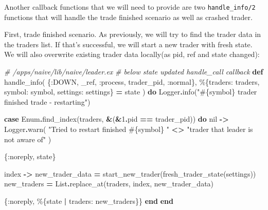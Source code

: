 \documentclass[
]{book}
\newenvironment{Shaded}{\begin{snugshade}}{\end{snugshade}}
\newcommand{\CommentTok}[1]{\textcolor[rgb]{0.56,0.35,0.01}{\textit{#1}}}
\newcommand{\ConstantTok}[1]{\textcolor[rgb]{0.00,0.00,0.00}{#1}}
\newcommand{\DecValTok}[1]{\textcolor[rgb]{0.00,0.00,0.81}{#1}}
\newcommand{\KeywordTok}[1]{\textcolor[rgb]{0.13,0.29,0.53}{\textbf{#1}}}
\newcommand{\NormalTok}[1]{#1}
\newcommand{\OperatorTok}[1]{\textcolor[rgb]{0.81,0.36,0.00}{\textbf{#1}}}
\newcommand{\OtherTok}[1]{\textcolor[rgb]{0.56,0.35,0.01}{#1}}
\newcommand{\StringTok}[1]{\textcolor[rgb]{0.31,0.60,0.02}{#1}}
\newcommand{\VariableTok}[1]{\textcolor[rgb]{0.00,0.00,0.00}{#1}}
\begin{document}
Another callback functions that we will need to provide are two \texttt{handle\_info/2} functions that will handle the trade finished scenario as well as crashed trader.

First, trade finished scenario. As previously, we will try to find the trader data in the traders list. If that's successful, we will start a new trader with fresh state. We will also overwrite existing trader data locally(as pid, ref and state changed):

\begin{Shaded}
\begin{Highlighting}[]
  \CommentTok{\# /apps/naive/lib/naive/leader.ex}
  \CommentTok{\# below state updated handle\_call callback}
  \KeywordTok{def}\NormalTok{ handle\_info(}
\NormalTok{        \{}\VariableTok{:DOWN}\NormalTok{, \_ref, }\VariableTok{:process}\NormalTok{, trader\_pid, }\VariableTok{:normal}\NormalTok{\},}
\NormalTok{        \%\{}\VariableTok{traders:}\NormalTok{ traders, }\VariableTok{symbol:}\NormalTok{ symbol, }\VariableTok{settings:}\NormalTok{ settings\} }\OperatorTok{=}\NormalTok{ state}
\NormalTok{      ) }\KeywordTok{do}
    \ConstantTok{Logger}\OperatorTok{.}\NormalTok{info(}\StringTok{"}\OtherTok{\#\{}\NormalTok{symbol}\OtherTok{\}}\StringTok{ trader finished trade {-} restarting"}\NormalTok{)}

    \KeywordTok{case} \ConstantTok{Enum}\OperatorTok{.}\NormalTok{find\_index(traders, }\OperatorTok{\&}\NormalTok{(}\OperatorTok{\&}\DecValTok{1}\OperatorTok{.}\NormalTok{pid }\OperatorTok{==}\NormalTok{ trader\_pid)) }\KeywordTok{do}
      \ConstantTok{nil} \OperatorTok{{-}\textgreater{}}
        \ConstantTok{Logger}\OperatorTok{.}\NormalTok{warn(}
          \StringTok{"Tried to restart finished }\OtherTok{\#\{}\NormalTok{symbol}\OtherTok{\}}\StringTok{ "} \OperatorTok{\textless{}\textgreater{}}
            \StringTok{"trader that leader is not aware of"}
\NormalTok{        )}

\NormalTok{        \{}\VariableTok{:noreply}\NormalTok{, state\}}

\NormalTok{      index }\OperatorTok{{-}\textgreater{}}
\NormalTok{        new\_trader\_data }\OperatorTok{=}\NormalTok{ start\_new\_trader(fresh\_trader\_state(settings))}
\NormalTok{        new\_traders }\OperatorTok{=} \ConstantTok{List}\OperatorTok{.}\NormalTok{replace\_at(traders, index, new\_trader\_data)}

\NormalTok{        \{}\VariableTok{:noreply}\NormalTok{, \%\{state }\OperatorTok{|} \VariableTok{traders:}\NormalTok{ new\_traders\}\}}
    \KeywordTok{end}
  \KeywordTok{end}
\end{Highlighting}
\end{Shaded}
\end{document}
